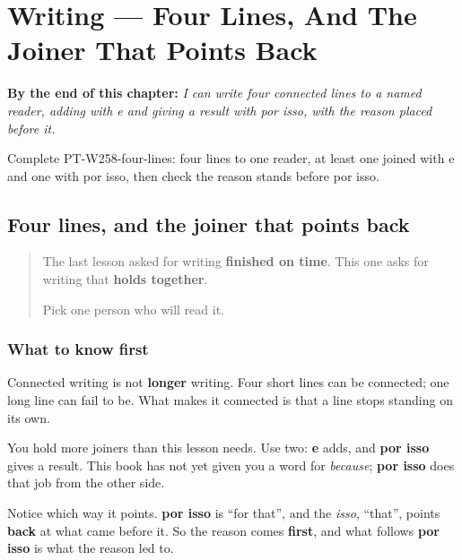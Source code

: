 
\chapter{Writing --- Four Lines, And The Joiner That Points Back}
\label{ch:pt-four-lines}

\begin{chapteropening}
\textbf{By the end of this chapter:} \emph{I can write four connected lines to a named reader, adding with e and giving a result with por isso, with the reason placed before it.}

Complete PT-W258-four-lines: four lines to one reader, at least one joined with e and one with por isso, then check the reason stands before por isso.
\end{chapteropening}

\section[por isso]{Four lines, and the joiner that points back}

\label{lesson:PT-W258-four-lines}



\begin{quote}
The last lesson asked for writing \textbf{finished on time}. This one asks for writing that \textbf{holds together}.

Pick one person who will read it.
\end{quote}

\subsection*{What to know first}
Connected writing is not \textbf{longer} writing. Four short lines can be connected; one long line can fail to be. What makes it connected is that a line stops standing on its own.

You hold more joiners than this lesson needs. Use two: \textbf{e} adds, and \textbf{por isso} gives a result. This book has not yet given you a word for \emph{because}; \textbf{por isso} does that job from the other side.

Notice which way it points. \textbf{por isso} is \textquotedblleft{}for that\textquotedblright{}, and the \emph{isso}, \textquotedblleft{}that\textquotedblright{}, points \textbf{back} at what came before it. So the reason comes \textbf{first}, and what follows \textbf{por isso} is what the reason led to.

